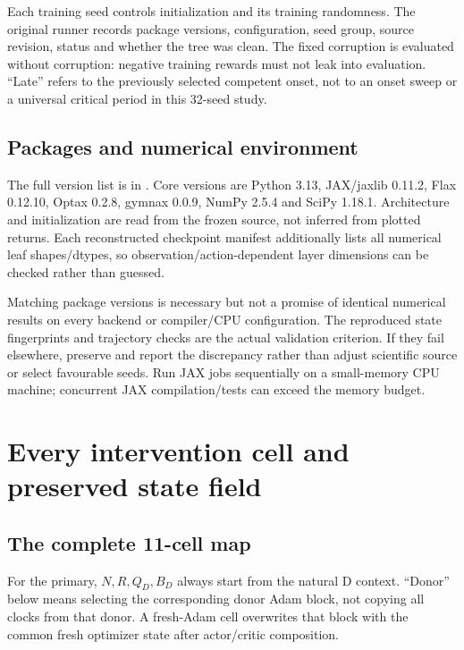 Each training seed controls initialization and its training randomness. The original runner records package versions, configuration, seed group, source revision, status and whether the tree was clean. The fixed corruption is evaluated without corruption: negative training rewards must not leak into evaluation. ``Late'' refers to the previously selected competent onset, not to an onset sweep or a universal critical period in this 32-seed study.

\subsection{Packages and numerical environment}
The full version list is in . Core versions are Python 3.13, JAX/jaxlib 0.11.2, Flax 0.12.10, Optax 0.2.8, gymnax 0.0.9, NumPy 2.5.4 and SciPy 1.18.1. Architecture and initialization are read from the frozen source, not inferred from plotted returns. Each reconstructed checkpoint manifest additionally lists all numerical leaf shapes/dtypes, so observation/action-dependent layer dimensions can be checked rather than guessed.

Matching package versions is necessary but not a promise of identical numerical results on every backend or compiler/CPU configuration. The reproduced state fingerprints and trajectory checks are the actual validation criterion. If they fail elsewhere, preserve and report the discrepancy rather than adjust scientific source or select favourable seeds. Run JAX jobs sequentially on a small-memory CPU machine; concurrent JAX compilation/tests can exceed the memory budget.

\section{Every intervention cell and preserved state field}\label{app:compositions}
\subsection{The complete 11-cell map}
For the primary, $N,R,Q_D,B_D$ always start from the natural D context. ``Donor'' below means selecting the corresponding donor Adam block, not copying all clocks from that donor. A fresh-Adam cell overwrites that block with the common fresh optimizer state after actor/critic composition.

